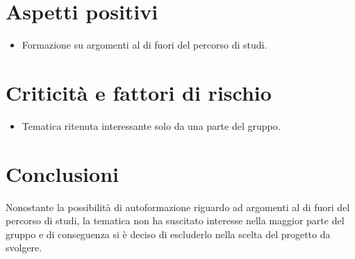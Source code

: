 \section{Aspetti positivi} \label{C6AspettiPositivi}
\begin{itemize}
	\item Formazione su argomenti al di fuori del percorso di studi.
\end{itemize}
\section{Criticità e fattori di rischio} \label{C6CriticitàEFattoriDiRischio}
\begin{itemize}
	\item Tematica ritenuta interessante solo da una parte del gruppo.
\end{itemize}
\section{Conclusioni} \label{C6Conclusioni}
Nonostante la possibilità di autoformazione riguardo ad argomenti al di fuori del percorso di studi, la tematica non ha suscitato interesse nella maggior parte del gruppo e di conseguenza si è deciso di escluderlo nella scelta del progetto da svolgere.
